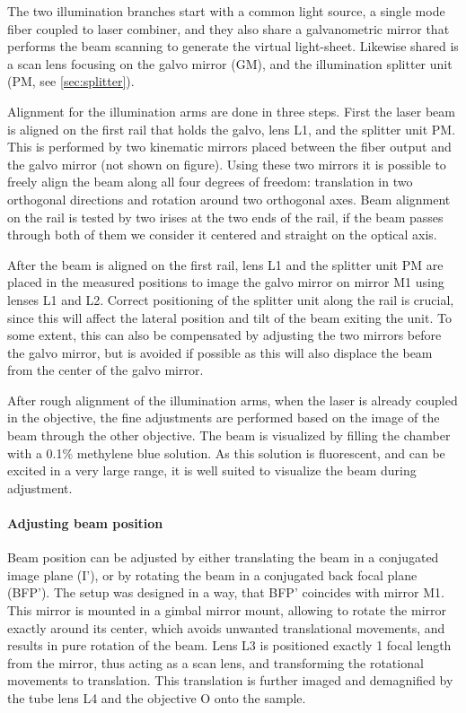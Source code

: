     The two illumination branches start with a common light source, a single mode fiber coupled to laser combiner, and they also share a galvanometric mirror that performs the beam scanning to generate the virtual light-sheet. Likewise shared is a scan lens focusing on the galvo mirror (GM), and the illumination splitter unit (PM, see \autoref{sec:splitter}).

    Alignment for the illumination arms are done in three steps. First the laser beam is aligned on the first rail that holds the galvo, lens L1, and the splitter unit PM. This is performed by two kinematic mirrors placed between the fiber output and the galvo mirror (not shown on figure). Using these two mirrors it is possible to freely align the beam along all four degrees of freedom: translation in two orthogonal directions and rotation around two orthogonal axes. Beam alignment on the rail is tested by two irises at the two ends of the rail, if the beam passes through both of them we consider it centered and straight on the optical axis.

    After the beam is aligned on the first rail, lens L1 and the splitter unit PM are placed in the measured positions to image the galvo mirror on mirror M1 using lenses L1 and L2. Correct positioning of the splitter unit along the rail is crucial, since this will affect the lateral position and tilt of the beam exiting the unit. To some extent, this can also be compensated by adjusting the two mirrors before the galvo mirror, but is avoided if possible as this will also displace the beam from the center of the galvo mirror.

    After rough alignment of the illumination arms, when the laser is already coupled in the objective, the fine adjustments are performed based on the image of the beam through the other objective. The beam is visualized by filling the chamber with a 0.1\% methylene blue solution. As this solution is fluorescent, and can be excited in a very large range, it is well suited to visualize the beam during adjustment.

    \paragraph{Adjusting beam position}
      Beam position can be adjusted by either translating the beam in a conjugated image plane (I'), or by rotating the beam in a conjugated back focal plane (BFP'). The setup was designed in a way, that BFP' coincides with mirror M1. This mirror is mounted in a gimbal mirror mount, allowing to rotate the mirror exactly around its center, which avoids unwanted translational movements, and results in pure rotation of the beam. Lens L3 is positioned exactly 1 focal length from the mirror, thus acting as a scan lens, and transforming the rotational movements to translation. This translation is further imaged and demagnified by the tube lens L4 and the objective O onto the sample.


